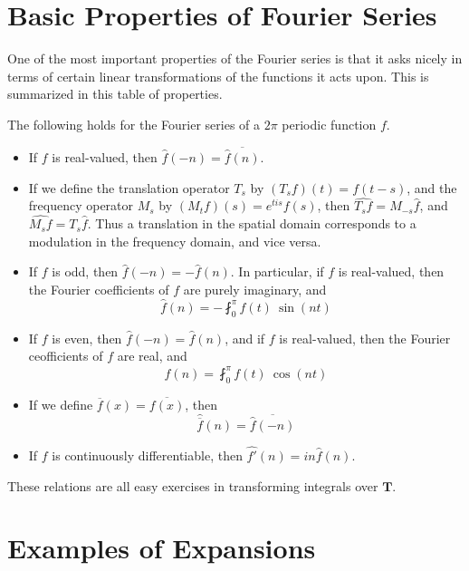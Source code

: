 \section{Basic Properties of Fourier Series}

One of the most important properties of the Fourier series is that it asks nicely in terms of certain linear transformations of the functions it acts upon. This is summarized in this table of properties.

\begin{theorem}
	The following holds for the Fourier series of a $2\pi$ periodic function $f$.
    \begin{itemize}
        \item If $f$ is real-valued, then $\widehat{f}(-n) = \overline{\widehat{f}(n)}$.

        \item If we define the translation operator $T_s$ by $(T_s f)(t) = f(t-s)$, and the frequency operator $M_s$ by $(M_t f)(s) = e^{tis}f(s)$, then $\widehat{T_s f} = M_{-s} \widehat{f}$, and $\widehat{M_s f} = T_s \widehat{f}$. Thus a translation in the spatial domain corresponds to a modulation in the frequency domain, and vice versa.

        \item If $f$ is odd, then $\widehat{f}(-n) = -\widehat{f}(n)$. In particular, if $f$ is real-valued, then the Fourier coefficients of $f$ are purely imaginary, and
        \[ \widehat{f}(n) = - \fint_0^\pi f(t)\ \sin(nt) \]

        \item If $f$ is even, then $\widehat{f}(-n) = \widehat{f}(n)$, and if $f$ is real-valued, then the Fourier ceofficients of $f$ are real, and
        \[ \widehat{f}(n) = \fint_0^\pi f(t)\ \cos(nt) \]

        \item If we define $\overline{f}(x) = \overline{f(x)}$, then
        \[ \widehat{\overline{f}}(n) = \overline{\widehat{f}(-n)} \]

        \item If $f$ is continuously differentiable, then $\widehat{f'}(n) = in \widehat{f}(n)$.
    \end{itemize}
    These relations are all easy exercises in transforming integrals over $\mathbf{T}$.
\end{theorem}

\section{Examples of Expansions}

